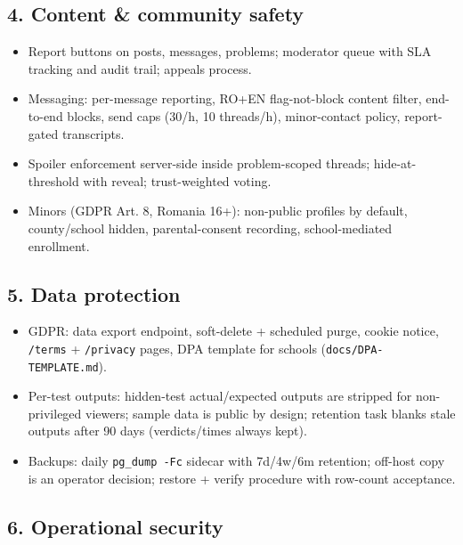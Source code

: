 \documentclass[
]{article}
\providecommand{\tightlist}{%
  \setlength{\itemsep}{0pt}\setlength{\parskip}{0pt}}
\begin{document}
\subsection{4. Content \& community
safety}\label{4-content--community-safety}

\begin{itemize}
\tightlist
\item
  Report buttons on posts, messages, problems; moderator queue with SLA
  tracking and audit trail; appeals process.
\item
  Messaging: per-message reporting, RO+EN flag-not-block content filter,
  end-to-end blocks, send caps (30/h, 10 threads/h), minor-contact
  policy, report-gated transcripts.
\item
  Spoiler enforcement server-side inside problem-scoped threads;
  hide-at-threshold with reveal; trust-weighted voting.
\item
  Minors (GDPR Art. 8, Romania 16+): non-public profiles by default,
  county/school hidden, parental-consent recording, school-mediated
  enrollment.
\end{itemize}

\subsection{5. Data protection}\label{5-data-protection}

\begin{itemize}
\tightlist
\item
  GDPR: data export endpoint, soft-delete + scheduled purge, cookie
  notice, \texttt{/terms} + \texttt{/privacy} pages, DPA template for
  schools (\texttt{docs/DPA-TEMPLATE.md}).
\item
  Per-test outputs: hidden-test actual/expected outputs are stripped for
  non-privileged viewers; sample data is public by design; retention
  task blanks stale outputs after 90 days (verdicts/times always kept).
\item
  Backups: daily \texttt{pg\_dump\ -Fc} sidecar with 7d/4w/6m retention;
  off-host copy is an operator decision; restore + verify procedure with
  row-count acceptance.
\end{itemize}

\subsection{6. Operational security}\label{6-operational-security}
\end{document}
